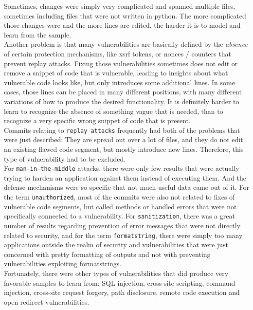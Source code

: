 \documentclass[
a4paper,
pagesize,
pdftex,
12pt,
twoside, %
BCOR=5mm, %
ngerman,
fleqn,
final,
]{scrartcl}
\begin{document}
	Sometimes, changes were simply very complicated and spanned multiple files, sometimes including files that were not written in python. The more complicated those changes were and the more lines are edited, the harder it is to model and learn from the sample.\\
	Another problem is that many vulnerabilities are basically defined by the \textit{absence} of certain protection mechanisms, like xsrf tokens, or nonces / counters that prevent replay attacks. Fixing those vulnerabilities sometimes does not edit or remove a snippet of code that is vulnerable, leading to insights about what vulnerable code looks like, but only introduces some additional lines. In some cases, those lines can be placed in many different positions, with many different variations of how to produce the desired functionality. It is definitely harder to learn to recognize the absence of something vague that is needed, than to recognize a very specific wrong snippet of code that is present.\\
	Commits relating to \texttt{replay attacks} frequently had both of the problems that were just described: They are spread out over a lot of files, and they do not edit an existing flawed code segment, but mostly introduce new lines. Therefore, this type of vulnerability had to be excluded.\\	
	For \texttt{man-in-the-middle} attacks, there were only few results that were actually trying to harden an application against them instead of executing them. And the defense mechanisms were so specific that not much useful data came out of it. For the term \texttt{unauthorized}, most of the commits were also not related to fixes of vulnerable code segments, but called methods or handled errors that were not specifically connected to a vulnerability. For \texttt{sanitization}, there was a great number of results regarding prevention of error messages that were not directly related to security, and for the term \texttt{formatstring}, there were simply too many applications outside the realm of security and vulnerabilities that were just concerned with pretty formatting of outputs and not with preventing vulnerabilities exploiting formatstrings.\\
	Fortunately, there were other types of vulnerabilities that did produce very favorable samples to learn from: SQL injection, cross-site scripting, command injection, cross-site request forgery, path disclosure, remote code execution and open redirect vulnerabilities. 
	
\end{document}
